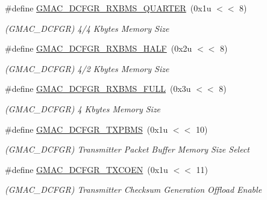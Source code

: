 \begin{DoxyCompactItemize}
\#define \mbox{\hyperlink{group__SAME70__GMAC_gafba34868045ec08fa21e3e99c91edb6f}{G\+M\+A\+C\+\_\+\+D\+C\+F\+G\+R\+\_\+\+R\+X\+B\+M\+S\+\_\+\+Q\+U\+A\+R\+T\+ER}}~(0x1u $<$$<$ 8)
\begin{DoxyCompactList}\small\item\em (G\+M\+A\+C\+\_\+\+D\+C\+F\+GR) 4/4 Kbytes Memory Size \end{DoxyCompactList}\item 
\mbox{\label{group__SAME70__GMAC_ga22ce8eaf9cd982892374ee2b51fddc4f}} 
\#define \mbox{\hyperlink{group__SAME70__GMAC_ga22ce8eaf9cd982892374ee2b51fddc4f}{G\+M\+A\+C\+\_\+\+D\+C\+F\+G\+R\+\_\+\+R\+X\+B\+M\+S\+\_\+\+H\+A\+LF}}~(0x2u $<$$<$ 8)
\begin{DoxyCompactList}\small\item\em (G\+M\+A\+C\+\_\+\+D\+C\+F\+GR) 4/2 Kbytes Memory Size \end{DoxyCompactList}\item 
\mbox{\label{group__SAME70__GMAC_ga521b3a5ff87bd4f749847584582bfe2a}} 
\#define \mbox{\hyperlink{group__SAME70__GMAC_ga521b3a5ff87bd4f749847584582bfe2a}{G\+M\+A\+C\+\_\+\+D\+C\+F\+G\+R\+\_\+\+R\+X\+B\+M\+S\+\_\+\+F\+U\+LL}}~(0x3u $<$$<$ 8)
\begin{DoxyCompactList}\small\item\em (G\+M\+A\+C\+\_\+\+D\+C\+F\+GR) 4 Kbytes Memory Size \end{DoxyCompactList}\item 
\mbox{\label{group__SAME70__GMAC_ga0e14fdcd2111e80d322c8ddd5c96d838}} 
\#define \mbox{\hyperlink{group__SAME70__GMAC_ga0e14fdcd2111e80d322c8ddd5c96d838}{G\+M\+A\+C\+\_\+\+D\+C\+F\+G\+R\+\_\+\+T\+X\+P\+B\+MS}}~(0x1u $<$$<$ 10)
\begin{DoxyCompactList}\small\item\em (G\+M\+A\+C\+\_\+\+D\+C\+F\+GR) Transmitter Packet Buffer Memory Size Select \end{DoxyCompactList}\item 
\mbox{\label{group__SAME70__GMAC_gafc756df472d0b7c3a9b8499ffad0c436}} 
\#define \mbox{\hyperlink{group__SAME70__GMAC_gafc756df472d0b7c3a9b8499ffad0c436}{G\+M\+A\+C\+\_\+\+D\+C\+F\+G\+R\+\_\+\+T\+X\+C\+O\+EN}}~(0x1u $<$$<$ 11)
\begin{DoxyCompactList}\small\item\em (G\+M\+A\+C\+\_\+\+D\+C\+F\+GR) Transmitter Checksum Generation Offload Enable \end{DoxyCompactList}\item 
$$
\end{DoxyCompactItemize}

